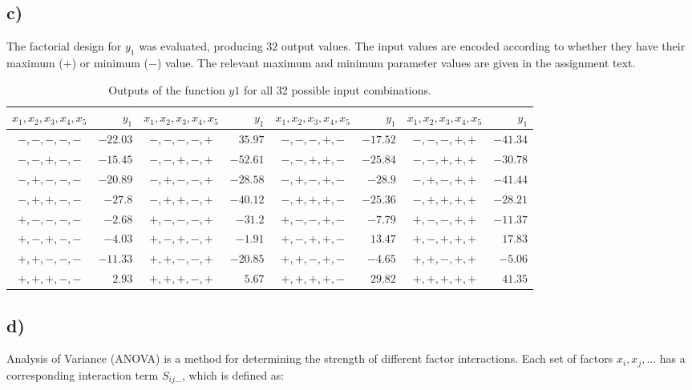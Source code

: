 \subsection*{c)}

The factorial design for $y_1$ was evaluated, producing $32$ output values. The input values are encoded according to whether they have their maximum ($+$) or minimum ($-$) value. The relevant maximum and minimum parameter values are given in the assignment text. \cite[p.4]{homework-w4}

\begin{table}[h!]
\centering
\begin{tabular}{cr|cr|cr|cr}
	$x_1, x_2, x_3, x_4, x_5$ & $y_1$ &$x_1, x_2, x_3, x_4, x_5$ & $y_1$ &$x_1, x_2, x_3, x_4, x_5$ & $y_1$ &$x_1, x_2, x_3, x_4, x_5$ & $y_1$ \\
	\hline
	$-,-,-,-,-$ & $-22.03$ & $-,-,-,-,+$ & $35.97$ & $-,-,-,+,-$ & $-17.52$ & $-,-,-,+,+$ & $-41.34$\\
	$-,-,+,-,-$ & $-15.45$ & $-,-,+,-,+$ & $-52.61$ & $-,-,+,+,-$ & $-25.84$ & $-,-,+,+,+$ & $-30.78$\\
	$-,+,-,-,-$ & $-20.89$ & $-,+,-,-,+$ & $-28.58$ & $-,+,-,+,-$ & $-28.9$ & $-,+,-,+,+$ & $-41.44$\\
	$-,+,+,-,-$ & $-27.8$ & $-,+,+,-,+$ & $-40.12$ & $-,+,+,+,-$ & $-25.36$ & $-,+,+,+,+$ & $-28.21$\\
	$+,-,-,-,-$ & $-2.68$ & $+,-,-,-,+$ & $-31.2$ & $+,-,-,+,-$ & $-7.79$ & $+,-,-,+,+$ & $-11.37$\\
	$+,-,+,-,-$ & $-4.03$ & $+,-,+,-,+$ & $-1.91$ & $+,-,+,+,-$ & $13.47$ & $+,-,+,+,+$ & $17.83$\\
	$+,+,-,-,-$ & $-11.33$ & $+,+,-,-,+$ & $-20.85$ & $+,+,-,+,-$ & $-4.65$ & $+,+,-,+,+$ & $-5.06$\\
	$+,+,+,-,-$ & $2.93$ & $+,+,+,-,+$ & $5.67$ & $+,+,+,+,-$ & $29.82$ & $+,+,+,+,+$ & $41.35$\\
\end{tabular}
\caption{Outputs of the function $y1$ for all 32 possible input combinations.}
\label{tab:outputs_y1}
\end{table}

\subsection*{d)}

Analysis of Variance (ANOVA) is a method for determining the strength of different factor interactions. Each set of factors $x_i, x_j, \dots$ has a corresponding interaction term $S_{ij\dots}$, which is defined as:

